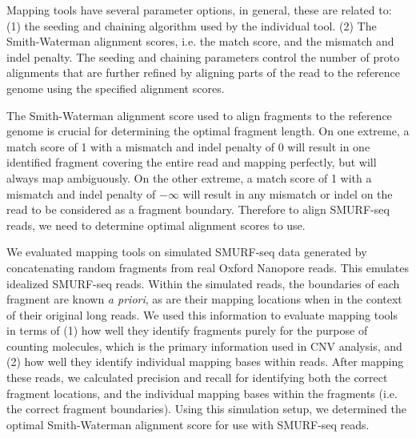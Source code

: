 Mapping tools have several parameter options, in general, these are
related to: (1) the seeding and chaining algorithm used by the
individual tool.  (2) The Smith-Waterman alignment scores, i.e. the
match score, and the mismatch and indel penalty. The seeding and
chaining parameters control the number of proto alignments that are
further refined by aligning parts of the read to the reference genome
using the specified alignment scores.

The Smith-Waterman alignment score used to align fragments to the
reference genome is crucial for determining the optimal fragment length.
On one extreme, a match score of 1 with a mismatch and indel penalty of
0 will result in one identified fragment covering the entire read and
mapping perfectly, but will always map ambiguously. On the other
extreme, a match score of 1 with a mismatch and indel penalty of
$-\infty$ will result in any mismatch or indel on the read to be
considered as a fragment boundary. Therefore to align SMURF-seq reads,
we need to determine optimal alignment scores to use.

We evaluated mapping tools on simulated SMURF-seq data generated by
concatenating random fragments from real Oxford Nanopore reads. This
emulates idealized SMURF-seq reads. Within the simulated reads, the
boundaries of each fragment are known \textit{a priori}, as are their
mapping locations when in the context of their original long reads. We
used this information to evaluate mapping tools in terms of (1) how well
they identify fragments purely for the purpose of counting molecules,
which is the primary information used in CNV analysis, and (2) how well
they identify individual mapping bases within reads. After mapping these
reads, we calculated precision and recall for identifying both the
correct fragment locations, and the individual mapping bases within the
fragments (i.e. the correct fragment boundaries). Using this simulation
setup, we determined the optimal Smith-Waterman alignment score for use
with SMURF-seq reads.

